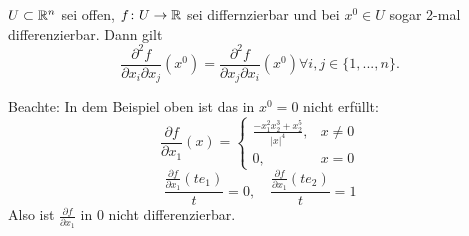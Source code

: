 \begin{satz}
	$ U \subset\mathbb{R}^n $ sei offen, $ f\colon U\rightarrow\mathbb{R} $ sei differnzierbar und bei $ x^0\in U $ sogar 2-mal differenzierbar. Dann gilt
	\[ \frac{\partial^2 f}{\partial x_i\partial x_j}(x^0)=\frac{\partial^2 f}{\partial x_j\partial x_i}(x^0)\forall i,j\in\lbrace 1,...,n\rbrace. \]
\end{satz}
Beachte: In dem Beispiel oben ist das in $ x^0=0 $ nicht erf\"ullt:
\[ \frac{\partial f}{\partial x_1}(x)=\begin{cases}
\frac{-x_1^2x_2^3+x_2^5}{|x|^4},&x\neq 0\\0,&x=0
\end{cases} \]
\[ \frac{\frac{\partial f}{\partial x_1}(te_1)}{t}=0,\quad\frac{\frac{\partial f}{\partial x_1}(te_2)}{t}=1 \]
Also ist $ \frac{\partial f}{\partial x_1} $ in $ 0 $ nicht differenzierbar.
